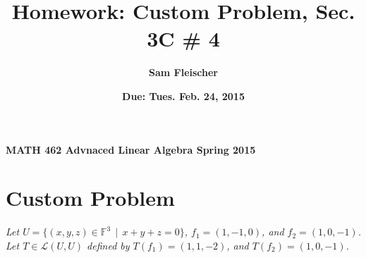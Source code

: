 \documentclass[12pt]{article}
\newcommand{\suchthat}{\, \mid \,}
\begin{document}
{\bf MATH 462 \hfill Advnaced Linear Algebra \hfill Spring 2015}

\title{\bf Homework: Custom Problem, Sec. 3C \# 4}
\author{\bf Sam Fleischer}
\date{\bf Due: Tues. Feb. 24, 2015}

{\let\newpage\relax\maketitle}
\maketitle

\section*{Custom Problem}
{\it Let $U = \{(x, y, z) \in \mathbb{F}^3 \suchthat x + y + z = 0\}$, $f_1 = (1, -1, 0)$, and $f_2 = (1, 0, -1)$.  Let $T \in \mathcal{L}(U, U)$ defined by $T(f_1) = (1, 1, -2)$, and $T(f_2) = (1, 0, -1)$.}
\end{document}
